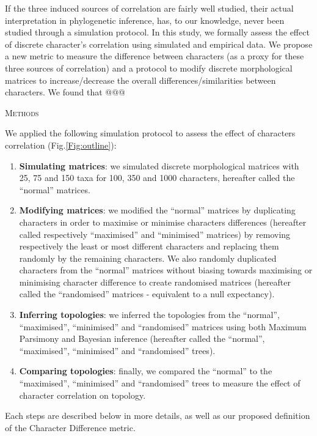 \documentclass[12pt,letterpaper]{article}
\renewcommand{\section}[1]{%
\bigskip
\begin{center}
\begin{Large}
\normalfont\scshape #1
\medskip
\end{Large}
\end{center}}
\begin{document}
If the three induced sources of correlation are fairly well studied, their actual interpretation in phylogenetic inference, has, to our knowledge, never been studied through a simulation protocol.
In this study, we formally assess the effect of discrete character's correlation using simulated and empirical data.
We propose a new metric to measure the difference between characters (as a proxy for these three sources of correlation) and a protocol to modify discrete morphological matrices to increase/decrease the overall differences/similarities between characters.
We found that @@@




\section{Methods}

We applied the following simulation protocol to assess the effect of characters correlation (Fig.\ref{Fig:outline}):
\begin{enumerate}
    \item \textbf{Simulating matrices}: we simulated discrete morphological matrices with 25, 75 and 150 taxa for 100, 350 and 1000 characters, hereafter called the ``normal'' matrices.
    \item \textbf{Modifying matrices}: we modified the ``normal'' matrices by duplicating characters in order to maximise or minimise characters differences (hereafter called respectively ``maximised'' and ``minimised'' matrices) by removing respectively the least or most different characters and replacing them randomly by the remaining characters.
    We also randomly duplicated characters from the ``normal'' matrices without biasing towards maximising or minimising character difference to create randomised matrices (hereafter called the ``randomised'' matrices - equivalent to a null expectancy).
    \item \textbf{Inferring topologies}: we inferred the topologies from the ``normal'', ``maximised'', ``minimised'' and ``randomised'' matrices using both Maximum Parsimony and Bayesian inference (hereafter called the ``normal'', ``maximised'', ``minimised'' and ``randomised'' trees).
    \item \textbf{Comparing topologies}: finally, we compared the ``normal'' to the ``maximised'', ``minimised'' and ``randomised'' trees to measure the effect of character correlation on topology.
\end{enumerate}
Each steps are described below in more details, as well as our proposed definition of the Character Difference metric.
\end{document}
